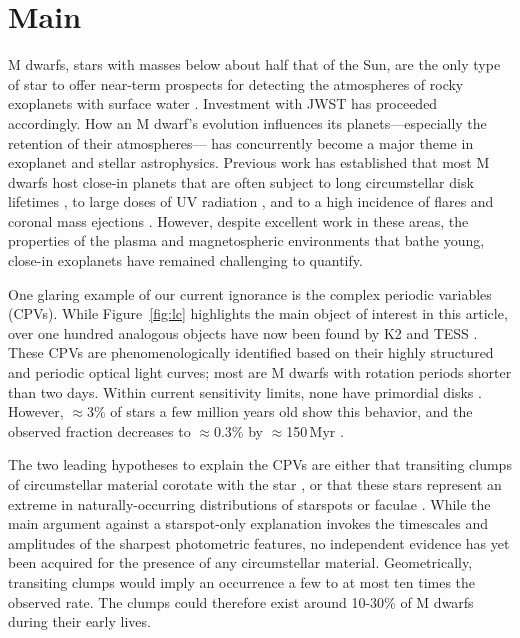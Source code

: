 \documentclass{nature3}
\begin{document}
\section{Main}
\label{sec:main}

M dwarfs, stars with masses below about half that of the Sun, are the
only type of star to offer near-term prospects for detecting the
atmospheres of rocky exoplanets with surface water
\cite{NAP26141}.  Investment with JWST has proceeded accordingly.  How
an M dwarf's evolution influences its planets---especially the
retention of their atmospheres--- has concurrently become a major
theme in exoplanet and stellar astrophysics.  Previous work has
established that most M dwarfs host close-in planets
\cite{Dressing2015} that are often subject to long
circumstellar disk lifetimes \cite{Ribas2015}, to large doses of UV
radiation \cite{France2013}, and to a high incidence of flares and
coronal mass ejections \cite{Gunther2020}.  However, despite excellent
work in these areas, the properties of the plasma and magnetospheric
environments that bathe young, close-in exoplanets have remained
challenging to quantify.

One glaring example of our current ignorance is the complex periodic
variables (CPVs).  While Figure~\ref{fig:lc} highlights the main object of
interest in this article, over one hundred analogous objects have
now been found by K2 and TESS 
\cite{Rebull2016,Stauffer2017,Rebull2018,Zhan2019,Rebull2020,Bouma2024}.
These CPVs are
phenomenologically identified based on their highly structured and
periodic optical light curves;
most are M dwarfs with rotation periods shorter than two days.
Within current sensitivity limits, none have primordial disks
\cite{Stauffer2017,Bouma2024}.
However, $\approx$3\% of stars a few million years old show this
behavior, and the observed fraction decreases to $\approx$0.3\%
by $\approx$150\,Myr \cite{Rebull2020}.

The two leading hypotheses to explain the CPVs are either that
transiting clumps of circumstellar material corotate with the star
\cite{Stauffer2017,Gunther2022,Bouma2024}, or that these stars represent
an extreme in naturally-occurring distributions of starspots or faculae
\cite{Koen2021}.  
While the main argument against a starspot-only explanation invokes the
timescales and amplitudes of the sharpest photometric features, no
independent evidence has yet been acquired for the presence of any
circumstellar material.  Geometrically, transiting clumps would imply an
occurrence a few to at most ten times the observed rate.  The clumps
could therefore exist around 10-30\% of M dwarfs during their early
lives.
\end{document}
